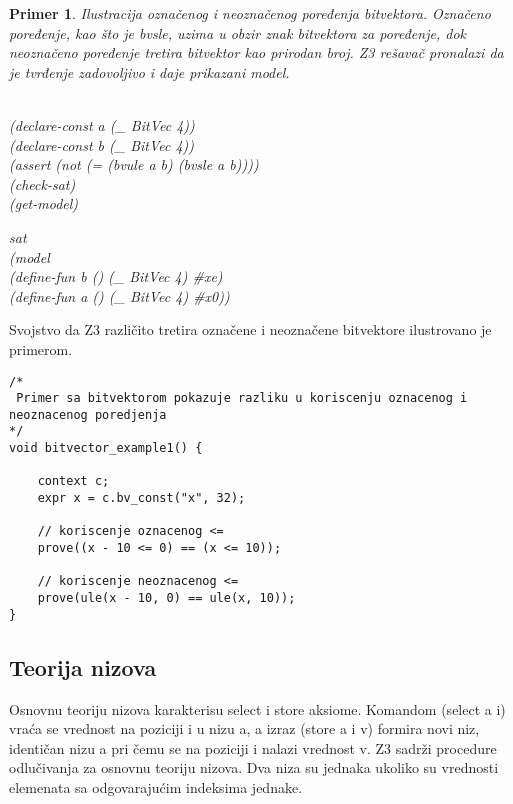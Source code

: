 \documentclass[12pt,oneside]{memoir}
\newtheorem{primer}{Primer}
\begin{document}
\begin{primer} Ilustracija označenog i neoznačenog poređenja bitvektora. Označeno poređenje, kao što je bvsle, uzima u obzir znak bitvektora za poređenje, dok neoznačeno poređenje tretira bitvektor kao prirodan broj. Z3 rešavač pronalazi da je tvrđenje zadovoljivo i daje prikazani model.
\\ \\
\begin{minipage}[b]{0.5\textwidth}
(declare-const a (\_ BitVec 4))
\\(declare-const b (\_ BitVec 4))
\\(assert (not (= (bvule a b) (bvsle a b))))
\\(check-sat)
\\(get-model)
\end{minipage}
\hspace{1cm} 
\begin{minipage}[t]{0.5\textwidth}
\vspace{-2.8cm}
sat 
\\(model 
\\(define-fun b () (\_ BitVec 4) \#xe) 
\\(define-fun a () (\_ BitVec 4) \#x0))
\end{minipage}


\end{primer}
Svojstvo da Z3 različito tretira označene i neoznačene bitvektore ilustrovano je  primerom.
\\ 
\begin{lstlisting}
/*
 Primer sa bitvektorom pokazuje razliku u koriscenju oznacenog i neoznacenog poredjenja
*/
void bitvector_example1() {

    context c;
    expr x = c.bv_const("x", 32);
    
    // koriscenje oznacenog <=
    prove((x - 10 <= 0) == (x <= 10));

    // koriscenje neoznacenog <=
    prove(ule(x - 10, 0) == ule(x, 10));
}

\end{lstlisting}

\subsection{Teorija nizova}
Osnovnu teoriju nizova karakterisu select i store aksiome. 
Komandom (select a i) vraća se vrednost na poziciji i u nizu a, a izraz (store a i v) formira novi niz, identičan nizu a pri čemu se na poziciji i nalazi vrednost v.
Z3 sadrži procedure odlučivanja za osnovnu teoriju nizova.
Dva niza su jednaka ukoliko su vrednosti elemenata sa odgovarajućim indeksima jednake.
\\
 
\end{document}
